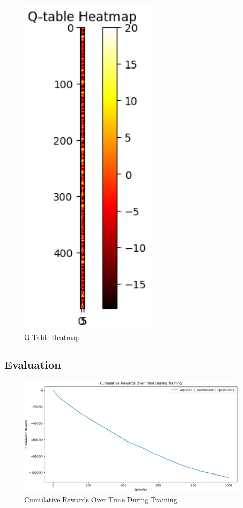 \begin{figure}[H]  %
    \centering
    \includegraphics[width=0.5\linewidth, height=0.5\textheight]{figures/Q-Table_HeatMap.PNG}
    \caption{Q-Table Heatmap}
    \label{fig:QTableHeatmap}
\end{figure}

\subsection{Evaluation}
\begin{figure}[H]  %
    \centering
    \includegraphics[width=1\linewidth]{figures/Cumulative_Rewards_Over_Time_During_Training.PNG}
    \caption{Cumulative Rewards Over Time During Training}
    \label{fig:Cumulative Rewards Over Time During Training}
\end{figure}







